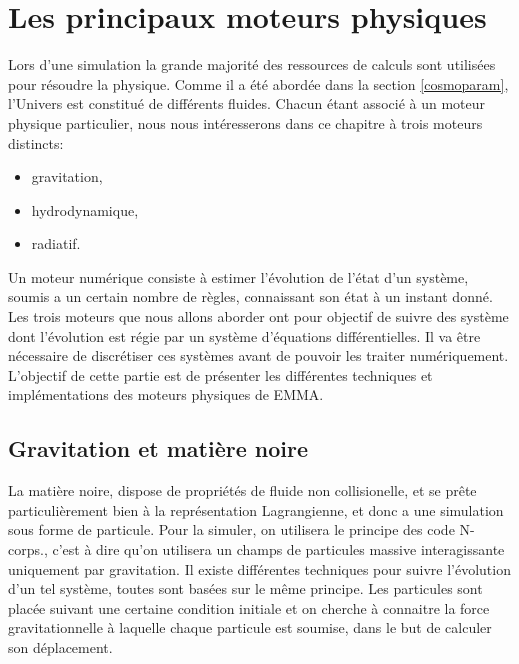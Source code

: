 \chapter{Les principaux moteurs physiques}
\label{sec:solvers}


Lors d'une simulation la grande majorité des ressources de calculs sont utilisées pour résoudre la physique.
Comme il a été abordée dans la section \ref{cosmoparam}, l'Univers est constitué de différents fluides.
Chacun étant associé à un moteur physique particulier, nous nous intéresserons dans ce chapitre à trois moteurs distincts:
\begin{itemize}
\item gravitation,
\item hydrodynamique,
\item radiatif.
\end{itemize}



Un moteur numérique consiste à estimer l'évolution de l'état d'un système, soumis a un certain nombre de règles, connaissant son état à un instant donné.
Les trois moteurs que nous allons aborder ont pour objectif de suivre des système dont l'évolution est régie par un système d'équations différentielles.
Il va être nécessaire de discrétiser ces systèmes avant de pouvoir les traiter numériquement.
L'objectif de cette partie est de présenter les différentes techniques et implémentations des moteurs physiques de EMMA.

\section{Gravitation et matière noire}
\label{sec:solverDM}

La matière noire, dispose de propriétés de fluide non collisionelle, et se prête particulièrement bien à la représentation Lagrangienne, et donc a une simulation sous forme de particule.
Pour la simuler, on utilisera le principe des code N-corps., c'est à dire qu'on utilisera un champs de particules massive interagissante uniquement par gravitation.
Il existe différentes techniques pour suivre l'évolution d'un tel système, toutes sont basées sur le même principe.
Les particules sont placée suivant une certaine condition initiale et on cherche à connaitre la force gravitationnelle à laquelle chaque particule est soumise, dans le but de calculer son déplacement.

